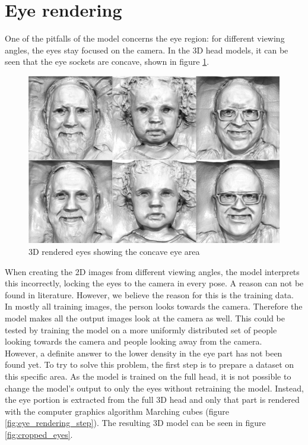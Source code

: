 \section{Eye rendering}
One of the pitfalls of the model concerns the eye region: for different viewing angles, the eyes stay focused on the camera. In the 3D head models, it can be seen that the eye sockets are concave, shown in figure \ref{fig:concave_eyes}.

\begin{figure}[H]
\centering
  \centering
  \includegraphics[width=.9\linewidth]{concave_eyes.jpg}
  \caption{3D rendered eyes showing the concave eye area \cite{chan2022efficient}}
  \label{fig:concave_eyes}
\end{figure}

When creating the 2D images from different viewing angles, the model interprets this incorrectly, locking the eyes to the camera in every pose. A reason can not be found in literature. However, we believe the reason for this is the training data. In mostly all training images, the person looks towards the camera. Therefore the model makes all the output images look at the camera as well. This could be tested by training the model on a more uniformly distributed set of people looking towards the camera and people looking away from the camera. \\
However, a definite answer to the lower density in the eye part has not been found yet. To try to solve this problem, the first step is to prepare a dataset on this specific area. As the model is trained on the full head, it is not possible to change the model's output to only the eyes without retraining the model. Instead, the eye portion is extracted from the full 3D head and only that part is rendered with the computer graphics algorithm Marching cubes (figure \ref{fig:eye_rendering_step}). The resulting 3D model can be seen in figure \ref{fig:cropped_eyes}.

